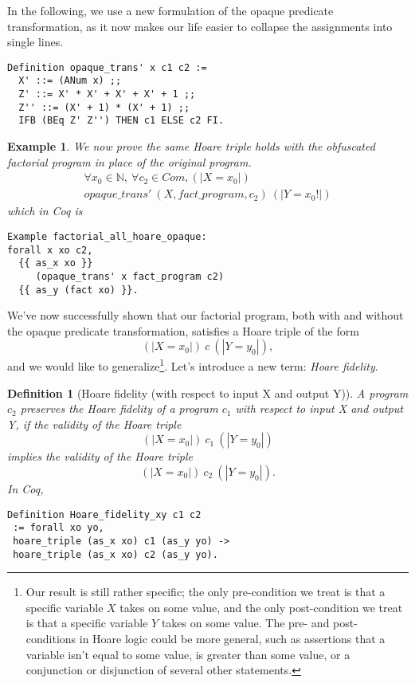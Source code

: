 \documentclass[compsoc,conference,a4paper,10pt,times]{IEEEtran}
\newtheorem{defin}[theorem]{Definition}
\newtheorem{example}[theorem]{Example}
\begin{document}
\par

In the following, we use a new formulation of the opaque predicate transformation, as it now makes our life easier to collapse the assignments into single lines.

\begin{verbatim}
Definition opaque_trans' x c1 c2 :=
  X' ::= (ANum x) ;;
  Z' ::= X' * X' + X' + X' + 1 ;;
  Z'' ::= (X' + 1) * (X' + 1) ;;
  IFB (BEq Z' Z'') THEN c1 ELSE c2 FI.
\end{verbatim}

\begin{example}\label{hoarel2}
    We now prove the same Hoare triple holds with the obfuscated factorial program in place of the original program.
    \[
    \begin{array}{c}
    \forall x_0 \in \mathbb{N},\ \forall c_2 \in Com, (|X=x_0|)\\ opaque\_trans'\ (X, fact\_program, c_2)\ (|Y=x_0!|)
    \end{array}
    \]
     \noindent    
    which in Coq is
\begin{verbatim}
Example factorial_all_hoare_opaque: 
forall x xo c2,
  {{ as_x xo }} 
     (opaque_trans' x fact_program c2) 
  {{ as_y (fact xo) }}.
\end{verbatim}
\end{example}

We've now successfully shown that our factorial program, both with and without the opaque predicate transformation, satisfies a Hoare triple of the form
\[ (| X = x_0 |)\ c\ (| Y = y_0 |), \]
and we would like to generalize\footnote{Our result is still rather specific; the only pre-condition we treat is that a specific variable $X$ takes on some value, and the only post-condition we treat is that a specific variable $Y$ takes on some value.  The pre- and post- conditions in Hoare logic could be more general, such as assertions that a variable isn't equal to some value, is greater than some value, or a conjunction or disjunction of several other statements.}.  Let's introduce a new term: \emph{Hoare fidelity}.

\begin{defin}[Hoare fidelity (with respect to input X and output Y)]
A program $c_2$ preserves the Hoare fidelity of a program $c_1$ with respect to input X and output Y, if the validity of the Hoare triple
\[
(| X = x_0 |)\ c_1\ (| Y = y_0 |)
\]
implies the validity of the Hoare triple
\[
(| X = x_0 |)\ c_2\ (| Y = y_0 |).
\]
In Coq,
\begin{verbatim}
Definition Hoare_fidelity_xy c1 c2 
 := forall xo yo,
 hoare_triple (as_x xo) c1 (as_y yo) -> 
 hoare_triple (as_x xo) c2 (as_y yo).\end{verbatim}
\end{defin}
\end{document}
